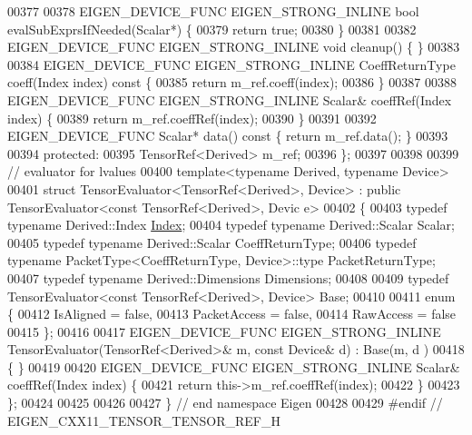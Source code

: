 \begin{DoxyCode}
00377 
00378   EIGEN\_DEVICE\_FUNC EIGEN\_STRONG\_INLINE \textcolor{keywordtype}{bool} evalSubExprsIfNeeded(Scalar*) \{
00379     \textcolor{keywordflow}{return} \textcolor{keyword}{true};
00380   \}
00381 
00382   EIGEN\_DEVICE\_FUNC EIGEN\_STRONG\_INLINE \textcolor{keywordtype}{void} cleanup() \{ \}
00383 
00384   EIGEN\_DEVICE\_FUNC EIGEN\_STRONG\_INLINE CoeffReturnType coeff(Index index)\textcolor{keyword}{ const }\{
00385     \textcolor{keywordflow}{return} m\_ref.coeff(index);
00386   \}
00387 
00388   EIGEN\_DEVICE\_FUNC EIGEN\_STRONG\_INLINE Scalar& coeffRef(Index index) \{
00389     \textcolor{keywordflow}{return} m\_ref.coeffRef(index);
00390   \}
00391 
00392   EIGEN\_DEVICE\_FUNC Scalar* data()\textcolor{keyword}{ const }\{ \textcolor{keywordflow}{return} m\_ref.data(); \}
00393 
00394  \textcolor{keyword}{protected}:
00395   TensorRef<Derived> m\_ref;
00396 \};
00397 
00398 
00399 \textcolor{comment}{// evaluator for lvalues}
00400 \textcolor{keyword}{template}<\textcolor{keyword}{typename} Derived, \textcolor{keyword}{typename} Device>
00401 \textcolor{keyword}{struct }TensorEvaluator<TensorRef<Derived>, Device> : \textcolor{keyword}{public} TensorEvaluator<const TensorRef<Derived>, Devic
      e>
00402 \{
00403   \textcolor{keyword}{typedef} \textcolor{keyword}{typename} Derived::Index \hyperlink{namespace_eigen_a62e77e0933482dafde8fe197d9a2cfde}{Index};
00404   \textcolor{keyword}{typedef} \textcolor{keyword}{typename} Derived::Scalar Scalar;
00405   \textcolor{keyword}{typedef} \textcolor{keyword}{typename} Derived::Scalar CoeffReturnType;
00406   \textcolor{keyword}{typedef} \textcolor{keyword}{typename} PacketType<CoeffReturnType, Device>::type PacketReturnType;
00407   \textcolor{keyword}{typedef} \textcolor{keyword}{typename} Derived::Dimensions Dimensions;
00408 
00409   \textcolor{keyword}{typedef} TensorEvaluator<const TensorRef<Derived>, Device> Base;
00410 
00411   \textcolor{keyword}{enum} \{
00412     IsAligned = \textcolor{keyword}{false},
00413     PacketAccess = \textcolor{keyword}{false},
00414     RawAccess = \textcolor{keyword}{false}
00415   \};
00416 
00417   EIGEN\_DEVICE\_FUNC EIGEN\_STRONG\_INLINE TensorEvaluator(TensorRef<Derived>& m, \textcolor{keyword}{const} Device& d) : Base(m, d
      )
00418   \{ \}
00419 
00420   EIGEN\_DEVICE\_FUNC EIGEN\_STRONG\_INLINE Scalar& coeffRef(Index index) \{
00421     \textcolor{keywordflow}{return} this->m\_ref.coeffRef(index);
00422   \}
00423 \};
00424 
00425 
00426 
00427 \} \textcolor{comment}{// end namespace Eigen}
00428 
00429 \textcolor{preprocessor}{#endif // EIGEN\_CXX11\_TENSOR\_TENSOR\_REF\_H}
\end{DoxyCode}
